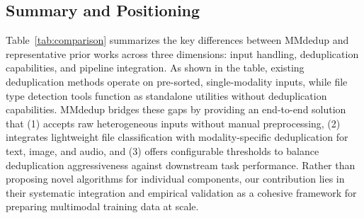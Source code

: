 \documentclass[sigconf, nonacm]{acmart}
\begin{document}

\subsection{Summary and Positioning}

Table~\ref{tab:comparison} summarizes the key differences between MMdedup and representative prior works across three dimensions: input handling, deduplication capabilities, and pipeline integration.
As shown in the table, existing deduplication methods operate on pre-sorted, single-modality inputs, while file type detection tools function as standalone utilities without deduplication capabilities. MMdedup bridges these gaps by providing an end-to-end solution that (1) accepts raw heterogeneous inputs without manual preprocessing, (2) integrates lightweight file classification with modality-specific deduplication for text, image, and audio, and (3) offers configurable thresholds to balance deduplication aggressiveness against downstream task performance. Rather than proposing novel algorithms for individual components, our contribution lies in their systematic integration and empirical validation as a cohesive framework for preparing multimodal training data at scale.
\end{document}

